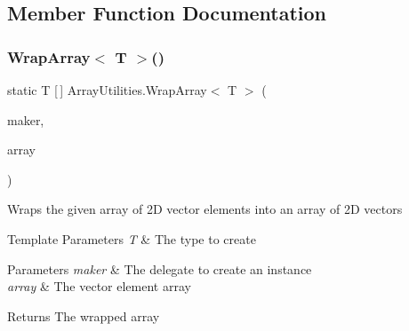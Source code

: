 \subsection{Member Function Documentation}
\mbox{\label{class_array_utilities_a068706b8c82301a0902908ed58740f67}} 
\subsubsection{\texorpdfstring{Wrap\+Array$<$ T $>$()}{WrapArray< T >()}\hspace{0.1cm}{\footnotesize\ttfamily [1/3]}}
{\footnotesize\ttfamily static T \mbox{[}$\,$\mbox{]} Array\+Utilities.\+Wrap\+Array$<$ T $>$ (\begin{DoxyParamCaption}\item[{Make\+Vector2$<$ T $>$}]{maker,  }\item[{double \mbox{[}$\,$\mbox{]}}]{array }\end{DoxyParamCaption})\hspace{0.3cm}{\ttfamily [static]}}



Wraps the given array of 2D vector elements into an array of 2D vectors 


\begin{DoxyTemplParams}{Template Parameters}
{\em T} & The type to create\\
\hline
\end{DoxyTemplParams}

\begin{DoxyParams}{Parameters}
{\em maker} & The delegate to create an instance\\
\hline
{\em array} & The vector element array\\
\hline
\end{DoxyParams}
\begin{DoxyReturn}{Returns}
The wrapped array
\end{DoxyReturn}
\mbox{\label{class_array_utilities_ac24cf72faa81c79fa7f8d06aad8e098b}} 
